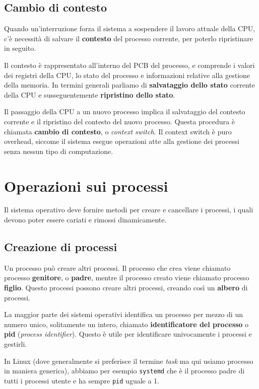     \subsection{Cambio di contesto}
        Quando un'interruzione forza il sistema a sospendere il lavoro attuale della CPU, c'è necessità di salvare il \textbf{contesto} del processo corrente, per poterlo ripristinare in seguito.
        
        Il contesto è rappresentato all'interno del PCB del processo, e comprende i valori dei registri della CPU, lo stato del processo e informazioni relative alla gestione della memoria. In termini generali parliamo di \textbf{salvataggio dello stato} corrente della CPU e susseguentemente \textbf{ripristino dello stato}.
        
        Il passaggio della CPU a un nuovo processo implica il salvataggio del contesto corrente e il ripristino del contesto del nuovo processo. Questa procedura è chiamata \textbf{cambio di contesto}, o \textit{context switch}. Il context switch è puro overhead, siccome il sistema esegue operazioni atte alla gestione dei processi senza nessun tipo di computazione.

\section{Operazioni sui processi}
    Il sistema operativo deve fornire metodi per creare e cancellare i processi, i quali devono poter essere cariati e rimossi dinamicamente.
    
    \subsection{Creazione di processi}
        Un processo può creare altri processi. Il processo che crea viene chiamato processo \textbf{genitore}, o \textbf{padre}, mentre il processo creato viene chiamato processo \textbf{figlio}. Questo processi possono creare altri processi, creando così un \textbf{albero} di processi.
        
        La maggior parte dei sistemi operativi identifica un processo per mezzo di un numero unico, solitamente un intero, chiamato \textbf{identificatore del processo} o \textbf{pid} (\textit{process identifier}). Questo è utile per identificare univocamente i processi e gestirli.
        
        In Linux (dove generalmente si preferisce il termine \textit{task} ma qui usiamo processo in maniera generica), abbiamo per esempio \texttt{systemd} che è il processo padre di tutti i processi utente e ha sempre \texttt{pid} uguale a 1.
        
